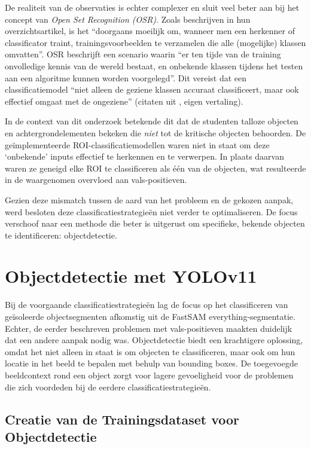 De realiteit van de observaties is echter complexer en sluit veel beter aan bij het concept van \textit{Open Set Recognition (OSR)}. 
Zoals \textcite{Geng2018} beschrijven in hun overzichtsartikel, is het 
``doorgaans moeilijk om, wanneer men een herkenner of classificator traint, trainingsvoorbeelden te verzamelen die alle (mogelijke) klassen omvatten''.
OSR beschrijft een scenario waarin 
``er ten tijde van de training onvolledige kennis van de wereld bestaat, en onbekende klassen tijdens het testen aan een algoritme kunnen worden voorgelegd''.
Dit vereist dat een classificatiemodel ``niet alleen de geziene klassen accuraat classificeert, maar ook effectief omgaat met de ongeziene'' (citaten uit \textcite{Geng2018}, eigen vertaling).

In de context van dit onderzoek betekende dit dat de studenten talloze objecten en achtergrondelementen bekeken die \textit{niet} tot de kritische objecten behoorden.
De geïmplementeerde ROI-classificatiemodellen waren niet in staat om deze `onbekende' inputs effectief te herkennen en te verwerpen.
In plaats daarvan waren ze geneigd elke ROI te classificeren als één van de objecten, wat resulteerde in de waargenomen overvloed aan vals-positieven.

Gezien deze mismatch tussen de aard van het probleem en de gekozen aanpak, werd besloten deze classificatiestrategieën niet verder te optimaliseren.
De focus verschoof naar een methode die beter is uitgerust om specifieke, bekende objecten te identificeren: objectdetectie.

\section{Objectdetectie met YOLOv11} 

Bij de voorgaande classificatiestrategieën lag de focus op het classificeren van geïsoleerde objectsegmenten afkomstig uit de FastSAM everything-segmentatie.
Echter, de eerder beschreven problemen met vals-positieven maakten duidelijk dat een andere aanpak nodig was.
Objectdetectie biedt een krachtigere oplossing, omdat het niet alleen in staat is om objecten te classificeren, maar ook om hun locatie in het beeld te bepalen met behulp van bounding boxes.
De toegevoegde beeldcontext rond een object zorgt voor lagere gevoeligheid voor de problemen die zich voordeden bij de eerdere classificatiestrategieën.

\subsection{Creatie van de Trainingsdataset voor Objectdetectie}


